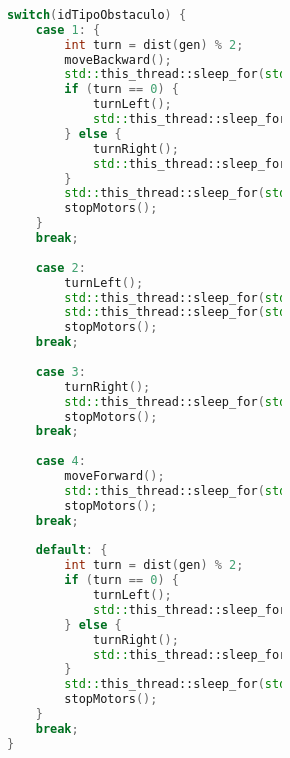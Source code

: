 \begin{lstlisting}[language={C++}, caption={Primer ajuste de c\'odigo}, label={Script}]
                                
                                switch(idTipoObstaculo) {
                                    case 1: {
                                        int turn = dist(gen) % 2;
                                        moveBackward();
                                        std::this_thread::sleep_for(std::chrono::seconds(5));
                                        if (turn == 0) {
                                            turnLeft();
                                            std::this_thread::sleep_for(std::chrono::seconds(5));
                                        } else {
                                            turnRight();
                                            std::this_thread::sleep_for(std::chrono::seconds(5));
                                        }
                                        std::this_thread::sleep_for(std::chrono::seconds(2));
                                        stopMotors();
                                    }
                                    break;
                                    
                                    case 2:
                                        turnLeft();
                                        std::this_thread::sleep_for(std::chrono::seconds(5));
                                        std::this_thread::sleep_for(std::chrono::seconds(2));
                                        stopMotors();
                                    break;
                                    
                                    case 3:
                                        turnRight();
                                        std::this_thread::sleep_for(std::chrono::seconds(7));
                                        stopMotors();
                                    break;
                                    
                                    case 4:
                                        moveForward();
                                        std::this_thread::sleep_for(std::chrono::seconds(2));
                                        stopMotors();
                                    break;
                                    
                                    default: {
                                        int turn = dist(gen) % 2;
                                        if (turn == 0) {
                                            turnLeft();
                                            std::this_thread::sleep_for(std::chrono::seconds(5));
                                        } else {
                                            turnRight();
                                            std::this_thread::sleep_for(std::chrono::seconds(5));
                                        }
                                        std::this_thread::sleep_for(std::chrono::seconds(2));
                                        stopMotors();
                                    }
                                    break;
                                }
        

\end{lstlisting}
